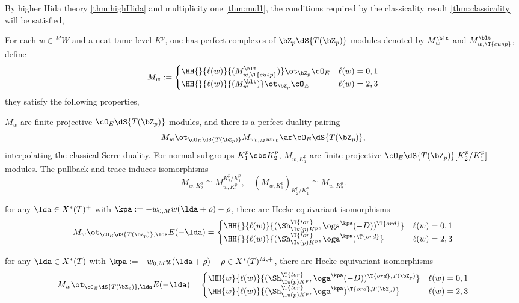 \documentclass[article, a4paper, twoside]{universal}
\begin{document}
\begin{prf}
    By higher Hida theory \cref{thm:highHida} and multiplicity one \cref{thm:mul1}, the conditions required by the classicality result \cref{thm:classicality} will be satisfied, 
\end{prf}

\begin{thm}\label{thm:highHida}
    For each $w\in{}^{M}W$ and a neat tame level $K^{p}$, one has perfect complexes of $\bZ_{p}\dS{T(\bZ_{p})}$-modules denoted by $M_{w}^{\blt}$ and $M_{w,\T{cusp}}^{\blt}$, define
    \[
        M_{w}:=\begin{cases}
          \HH{}{\ell(w)}{(M_{w,\T{cusp}}^{\blt})}\ot_{\bZ_{p}}\cO_{E} & \ell(w)=0,1 \\
          \HH{}{\ell(w)}{(M_{w}^{\blt})}\ot_{\bZ_{p}}\cO_{E} & \ell(w)=2,3
        \end{cases}
    \]
    they satisfy the following properties,
    \begin{itm}
        \item $M_{w}$ are finite projective $\cO_{E}\dS{T(\bZ_{p})}$-modules, and there is a perfect duality pairing
        \[
            M_{w}\ot_{\cO_{E}\dS{T(\bZ_{p})}}M_{w_{0,M}ww_{0}}\ar\cO_{E}\dS{T(\bZ_{p})},
        \]
        interpolating the classical Serre duality. For normal subgroups $K_{1}^{p}\sbs K_{2}^{p}$, $M_{w,K_{1}^{p}}$ are finite projective $\cO_{E}\dS{T(\bZ_{p})}[K_{2}^{p}/K_{1}^{p}]$-modules. The pullback and trace induces isomorphisms
        \[
            M_{w,K_{2}^{p}}\cong M_{w,K_{1}^{p}}^{K_{2}^{p}/K_{1}^{p}},\quad (M_{w,K_{1}^{p}})_{K_{2}^{p}/K_{1}^{p}}\cong M_{w,K_{2}^{p}}.
        \]
        \item for any $\lda\in X^{*}(T)^{+}$ with $\kpa:=-w_{0,M}w(\lda+\rho)-\rho$, there are Hecke-equivariant isomorphisms
        \[
            M_{w}\ot_{\cO_{E}\dS{T(\bZ_{p})},\lda}E(-\lda)=\begin{cases}
              \HH{}{\ell(w)}{(\Sh_{\Iw(p)K^{p}}^{\T{tor}},\oga^{\kpa}(-D))^{\T{ord}}} & \ell(w)=0,1\\
              \HH{}{\ell(w)}{(\Sh_{\Iw(p)K^{p}}^{\T{tor}},\oga^{\kpa})^{\T{ord}}} & \ell(w)=2,3
            \end{cases}
        \]
        \item for any $\lda\in X^{*}(T)$ with $\kpa:=-w_{0,M}w(\lda+\rho)-\rho\in X^{*}(T)^{M,+}$, there are Hecke-equivariant isomorphisms
        \[
            M_{w}\ot_{\cO_{E}\dS{T(\bZ_{p})},\lda}E(-\lda)=\begin{cases}
              \HH{w}{\ell(w)}{(\Sh_{\Iw(p)K^{p}}^{\T{tor}},\oga^{\kpa}(-D))^{\T{ord},T(\bZ_{p})}} & \ell(w)=0,1\\
              \HH{w}{\ell(w)}{(\Sh_{\Iw(p)K^{p}}^{\T{tor}},\oga^{\kpa})^{\T{ord},T(\bZ_{p})}} & \ell(w)=2,3
            \end{cases}
        \]
    \end{itm}
\end{thm}
\end{document}
